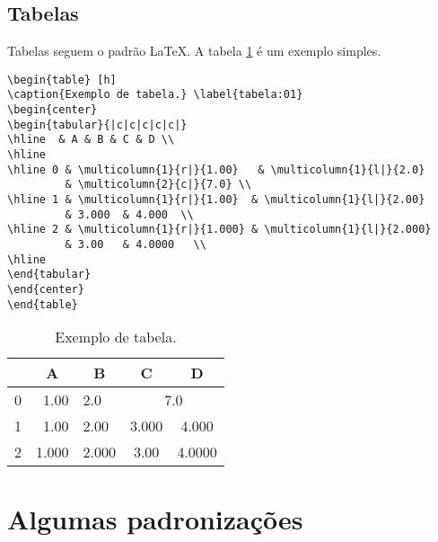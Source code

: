 \documentclass{TEMA}
\begin{document}
\subsection{Tabelas}

Tabelas seguem o padrão \LaTeX. A tabela \ref{tabela:01}  é um exemplo simples.

\begin{framed}
\begin{verbatim}
\begin{table} [h]
\caption{Exemplo de tabela.} \label{tabela:01}
\begin{center}
\begin{tabular}{|c|c|c|c|c|}
\hline  & A & B & C & D \\
\hline
\hline 0 & \multicolumn{1}{r|}{1.00}   & \multicolumn{1}{l|}{2.0}   
         & \multicolumn{2}{c|}{7.0} \\
\hline 1 & \multicolumn{1}{r|}{1.00}  & \multicolumn{1}{l|}{2.00}  
         & 3.000  & 4.000  \\
\hline 2 & \multicolumn{1}{r|}{1.000} & \multicolumn{1}{l|}{2.000} 
         & 3.00   & 4.0000   \\
\hline
\end{tabular}
\end{center}
\end{table}
\end{verbatim}
\end{framed}

\begin{table} [h]
\caption{Exemplo de tabela.} \label{tabela:01}
\begin{center}
\begin{tabular}{|c|c|c|c|c|}
\hline  & A & B & C & D \\
\hline
\hline 0 & \multicolumn{1}{r|}{1.00}   & \multicolumn{1}{l|}{2.0}   
         & \multicolumn{2}{c|}{7.0} \\
\hline 1 & \multicolumn{1}{r|}{1.00}  & \multicolumn{1}{l|}{2.00}  
         & 3.000  & 4.000  \\
\hline 2 & \multicolumn{1}{r|}{1.000} & \multicolumn{1}{l|}{2.000} 
         & 3.00   & 4.0000   \\
\hline
\end{tabular}
\end{center}
\end{table}


\section{Algumas padronizações}
\end{document}
